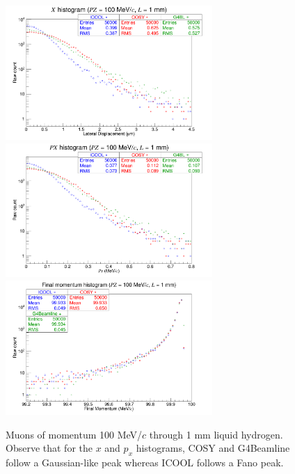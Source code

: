 \begin{figure}[H]
  \centering
    \includegraphics[width=0.7\textwidth]{Benchmarking/LH/X.100.1.png} 
    \includegraphics[width=0.7\textwidth]{Benchmarking/LH/PX.100.1.png} 
    \includegraphics[width=0.7\textwidth]{Benchmarking/LH/strag.100.1.png} 
  \caption[Muons of momentum 100 MeV/$c$ through 1 mm liquid hydrogen.]{Muons of momentum 100 MeV/$c$ through 1 mm liquid hydrogen. Observe that for the $x$ and $p_x$ histograms, COSY and G4Beamline follow a Gaussian-like peak whereas ICOOL follows a Fano peak.}
  \label{fig:100.1}
\end{figure}

